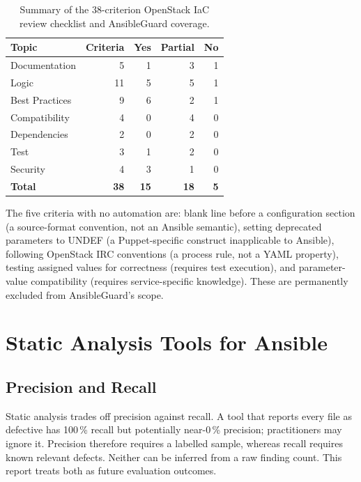 \begin{table}[htbp]
\centering
\caption{Summary of the 38-criterion OpenStack IaC review checklist and AnsibleGuard coverage.}
\label{tab:checklist_summary}
\small
\begin{tabular}{lrrrr}
\toprule
\textbf{Topic} & \textbf{Criteria} & \textbf{Yes} & \textbf{Partial} & \textbf{No} \\
\midrule
Documentation    & 5  & 1 & 3 & 1 \\
Logic            & 11 & 5 & 5 & 1 \\
Best Practices   & 9  & 6 & 2 & 1 \\
Compatibility    & 4  & 0 & 4 & 0 \\
Dependencies     & 2  & 0 & 2 & 0 \\
Test             & 3  & 1 & 2 & 0 \\
Security         & 4  & 3 & 1 & 0 \\
\midrule
\textbf{Total}   & \textbf{38} & \textbf{15} & \textbf{18} & \textbf{5} \\
\bottomrule
\end{tabular}
\end{table}

\noindent
The five criteria with no automation are: blank line before a configuration
section (a source-format convention, not an Ansible semantic), setting
deprecated parameters to UNDEF (a Puppet-specific construct inapplicable to
Ansible), following OpenStack IRC conventions (a process rule, not a YAML
property), testing assigned values for correctness (requires test execution),
and parameter-value compatibility (requires service-specific knowledge). These
are permanently excluded from AnsibleGuard's scope.

\section{Static Analysis Tools for Ansible}
\label{sec:static_bg}

\subsection{Precision and Recall}

Static analysis trades off precision against recall. A tool that reports
every file as defective has 100\,\% recall but potentially near-0\,\% precision;
practitioners may ignore it. Precision therefore requires a labelled sample,
whereas recall requires known relevant defects. Neither can be inferred from a
raw finding count. This report treats both as future evaluation outcomes.

